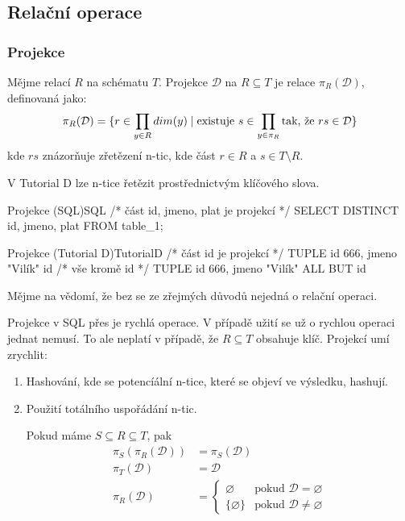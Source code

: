 \subsection{Relační operace}
\subsubsection{Projekce}
Mějme relací $R$ na schématu $T$. Projekce $\mathcal{D}$ na $R \subseteq T$ je relace $\pi_{R}(\mathcal{D})$, definovaná jako:
$$
\pi_{R}(\mathcal{D}) = \lbrace r \in \prod_{y \in R} dim(y) \thickspace | \thickspace \text{existuje } s \in \prod_{y \in \pi_{R}} \text{tak, že } rs \in \mathcal{D} \rbrace
$$
kde $rs$ znázorňuje zřetězení n-tic, kde část $r \in R$ a $s \in T \setminus R$.

V Tutorial D lze n-tice řetězit prostřednictvým klíčového slova.
\begin{upcode}{Projekce (SQL)}{}{SQL}
/* část id, jmeno, plat je projekcí */
SELECT DISTINCT id, jmeno, plat FROM table_1;
\end{upcode}
\begin{upcode}{Projekce (Tutorial D)}{}{TutorialD}
/* část {id} je projekcí */
TUPLE {id 666, jmeno "Vilík"} {id}
/* vše kromě id */
TUPLE {id 666, jmeno "Vilík"} {ALL BUT id}
\end{upcode}
Mějme na vědomí, že bez se ze zřejmých důvodů nejedná o relační operaci.

Projekce v SQL přes je rychlá operace. V případě užití se už o rychlou operaci jednat nemusí. To ale neplatí v případě, že $R \subseteq T$ obsahuje klíč. Projekcí umí zrychlit:
\begin{enumerate}
\item Hashování, kde se potencíální n-tice, které se objeví ve výsledku, hashují.
\item Použití totálního uspořádání n-tic.
\begin{upquote}
Pokud máme $S \subseteq R \subseteq T$, pak
\begin{align*}
\pi_{S} (\pi_{R}(\mathcal{D})) &= \pi_{S}(\mathcal{D}) \\
\pi_{T} (\mathcal{D}) &= \mathcal{D} \\
\pi_{R} (\mathcal{D}) &=\left\{\!\!\!
\begin{array}{ll}
\varnothing & \text{pokud } \mathcal{D} = \varnothing \\
\lbrace \varnothing \rbrace & \text{pokud } \mathcal{D} \neq \varnothing
\end{array}\right.
\end{align*}
\end{upquote}
\end{enumerate}

